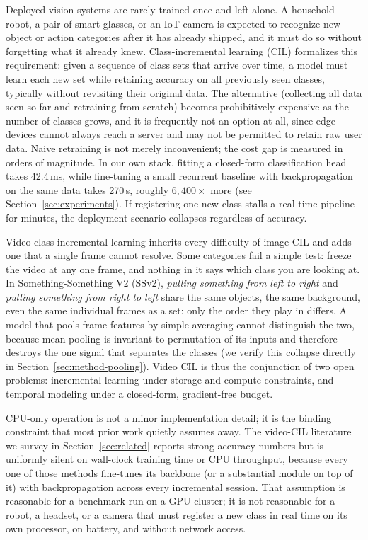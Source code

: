 \documentclass[11pt]{article}
\begin{document}
Deployed vision systems are rarely trained once and left alone. A household
robot, a pair of smart glasses, or an IoT camera is expected to recognize new
object or action categories after it has already shipped, and it must do so
without forgetting what it already knew. Class-incremental learning (CIL)
formalizes this requirement: given a sequence of class sets that arrive over
time, a model must learn each new set while retaining accuracy on all
previously seen classes, typically without revisiting their original data.
The alternative (collecting all data seen so far and retraining from
scratch) becomes prohibitively expensive as the number of classes grows,
and it is frequently not an option at all, since edge devices cannot always
reach a server and may not be permitted to retain raw user data. Naive
retraining is not merely inconvenient; the cost gap is measured in orders of
magnitude. In our own stack, fitting a closed-form classification head takes
42.4\,ms, while fine-tuning a small recurrent baseline with backpropagation
on the same data takes 270\,s, roughly $6{,}400\times$ more (see
Section~\ref{sec:experiments}). If registering one new class stalls a
real-time pipeline for minutes, the deployment scenario collapses regardless
of accuracy.

Video class-incremental learning inherits every difficulty of image CIL and
adds one that a single frame cannot resolve. Some categories fail a simple
test: freeze the video at any one frame, and nothing in it says which
class you are looking at. In Something-Something V2 (SSv2), \emph{pulling
something from left to right} and \emph{pulling something from right to
left} share the same objects, the same background, even the same
individual frames as a set: only the order they play in differs. A model
that pools
frame features by simple averaging cannot distinguish the two, because mean
pooling is invariant to permutation of its inputs and therefore destroys the
one signal that separates the classes (we verify this collapse directly in
Section~\ref{sec:method-pooling}). Video CIL is thus the conjunction of two
open problems: incremental learning under storage and compute constraints,
and temporal modeling under a closed-form, gradient-free budget.

CPU-only operation is not a minor implementation detail; it is the binding
constraint that most prior work quietly assumes away. The video-CIL
literature we survey in Section~\ref{sec:related} reports strong accuracy
numbers but is uniformly silent on wall-clock training time or CPU
throughput, because every one of those methods fine-tunes its backbone (or a
substantial module on top of it) with backpropagation across every
incremental session. That assumption is reasonable for a benchmark run on a
GPU cluster; it is not reasonable for a robot, a headset, or a camera that
must register a new class in real time on its own processor, on battery, and
without network access.
\end{document}
